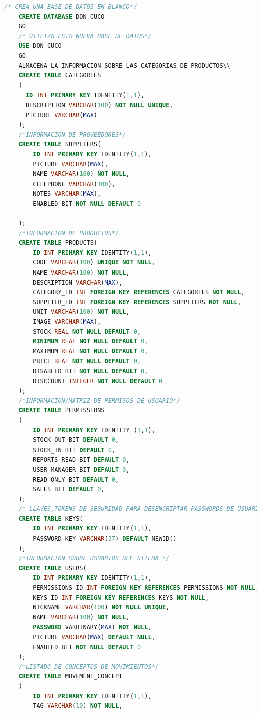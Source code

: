 \documentclass[a4paper,DIV=12]{scrreprt}
\begin{document}
\begin{lstlisting}[language={SQL}]
    /* CREA UNA BASE DE DATOS EN BLANCO*/
    CREATE DATABASE DON_CUCO
    GO
    /* UTILIZA ESTA NUEVA BASE DE DATOS*/
    USE DON_CUCO
    GO
    ALMACENA LA INFORMACION SOBRE LAS CATEGORIAS DE PRODUCTOS\\
    CREATE TABLE CATEGORIES
    (
      ID INT PRIMARY KEY IDENTITY(1,1),
      DESCRIPTION VARCHAR(100) NOT NULL UNIQUE,
      PICTURE VARCHAR(MAX)
    );
    /*INFORMACION DE PROVEEDORES*/
    CREATE TABLE SUPPLIERS(
        ID INT PRIMARY KEY IDENTITY(1,1),
        PICTURE VARCHAR(MAX),
        NAME VARCHAR(100) NOT NULL,
        CELLPHONE VARCHAR(100),
        NOTES VARCHAR(MAX),
        ENABLED BIT NOT NULL DEFAULT 0
    
    );
    /*INFORMACION DE PRODUCTOS*/
    CREATE TABLE PRODUCTS(
        ID INT PRIMARY KEY IDENTITY(1,1),
        CODE VARCHAR(100) UNIQUE NOT NULL,
        NAME VARCHAR(100) NOT NULL,
        DESCRIPTION VARCHAR(MAX),
        CATEGORY_ID INT FOREIGN KEY REFERENCES CATEGORIES NOT NULL,
        SUPPLIER_ID INT FOREIGN KEY REFERENCES SUPPLIERS NOT NULL,
        UNIT VARCHAR(100) NOT NULL,
        IMAGE VARCHAR(MAX),
        STOCK REAL NOT NULL DEFAULT 0,
        MINIMUM REAL NOT NULL DEFAULT 0,
        MAXIMUM REAL NOT NULL DEFAULT 0,
        PRICE REAL NOT NULL DEFAULT 0,
        DISABLED BIT NOT NULL DEFAULT 0,
        DISCCOUNT INTEGER NOT NULL DEFAULT 0
    );
    /*INFORMACION/MATRIZ DE PERMISOS DE USUARIO*/
    CREATE TABLE PERMISSIONS
    (
        ID INT PRIMARY KEY IDENTITY (1,1),
        STOCK_OUT BIT DEFAULT 0,
        STOCK_IN BIT DEFAULT 0,
        REPORTS_READ BIT DEFAULT 0,
        USER_MANAGER BIT DEFAULT 0,
        READ_ONLY BIT DEFAULT 0,
        SALES BIT DEFAULT 0,
    );
    /* LLAVES,TOKENS DE SEGURIDAD PARA DESENCRIPTAR PASSWORDS DE USUARIO*/
    CREATE TABLE KEYS(
        ID INT PRIMARY KEY IDENTITY(1,1),
        PASSWORD_KEY VARCHAR(37) DEFAULT NEWID()
    );
    /*INFORMACION SOBRE USUARIOS DEL SITEMA */
    CREATE TABLE USERS(
        ID INT PRIMARY KEY IDENTITY(1,1),
        PERMISSIONS_ID INT FOREIGN KEY REFERENCES PERMISSIONS NOT NULL,
        KEYS_ID INT FOREIGN KEY REFERENCES KEYS NOT NULL,
        NICKNAME VARCHAR(100) NOT NULL UNIQUE,
        NAME VARCHAR(100) NOT NULL,
        PASSWORD VARBINARY(MAX) NOT NULL,
        PICTURE VARCHAR(MAX) DEFAULT NULL,
        ENABLED BIT NOT NULL DEFAULT 0
    );
    /*LISTADO DE CONCEPTOS DE MOVIMIENTOS*/
    CREATE TABLE MOVEMENT_CONCEPT
    (
        ID INT PRIMARY KEY IDENTITY(1,1),
        TAG VARCHAR(10) NOT NULL,

\end{lstlisting}
\end{document}
